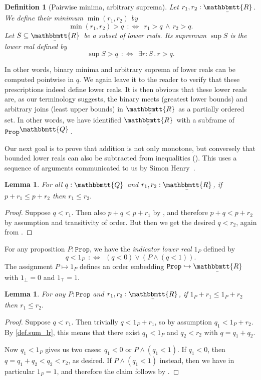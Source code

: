 \documentclass[reqno,11pt]{amsproc}
\theoremstyle{plain}
\newtheorem{lemma}[theorem]{Lemma}
\newtheorem{definition}[theorem]{Definition}
\theoremstyle{definition}
\newcommand{\Const}[1]{\mathtt{#1}}
\newcommand{\ubar}[1]{\underaccent{\bar}{#1}}
\newcommand{\ind}[1]{1_{#1}}			%
\newcommand{\internal}[1]{\raisebox{-.03ex}{$\mathbbmtt{#1}$}}
\newcommand{\hs}{\hspace{1pt}}
\newcommand{\tqq}{\internal{Q}\hs}
\newcommand{\trr}{\internal{R}}
\newcommand{\tlrr}{\ubar{\trr}\hs}
\newcommand{\prop}{\Const{Prop}}
\renewcommand{\iff}{\Leftrightarrow}
\numberwithin{equation}{section}
\begin{document}
\begin{definition}[Pairwise minima, arbitrary suprema]\label{def.min_sup}
Let $r_1,r_2:\tlrr$. We define their \emph{minimum} $\min(r_1,r_2)$ by
\[
	\min(r_1, r_2) > q \:\::\iff\:\: r_1 > q \,\wedge\, r_2 > q.
\]
Let $S \subseteq \tlrr$ be a subset of lower reals.
Its \emph{supremum} $\sup S$ is the lower real defined  by 
\[
	\sup S > q \:\::\iff\:\: \exists r : S \,.\, r > q.
\]
\end{definition}

In other words, binary minima and arbitrary suprema of lower reals can be computed pointwise in $q$. We again leave it to the reader to verify that these prescriptions indeed define lower reals. It is then obvious that these lower reals are, as our terminology suggests, the binary meets (greatest lower bounds) and arbitrary joins (least upper bounds) in $\tlrr$ as a partially ordered set. In other words, we have identified $\tlrr$ with a subframe of $\prop^{\tqq}$.

Our next goal is to prove that addition is not only monotone, but conversely that bounded lower reals can also be subtracted from inequalities (). This uses a sequence of arguments communicated to us by Simon Henry~\cite{henry2012simplification}.

\begin{lemma}
	\label{cancel_rationals}
	For all $q:\tqq$ and $r_1,r_2:\tlrr$, if $p + r_1\le p + r_2$ then $r_1 \le r_2$.
\end{lemma}

\begin{proof}
	Suppose $q < r_1$. Then also $p + q < p + r_1$ by , and therefore $p + q < p + r_2$ by assumption and transitivity of order. But then we get the desired $q < r_2$, again from .
\end{proof}

For any proposition $P : \prop$, we have the \emph{indicator lower real} $\ind{P}$ defined by
\[
	q < 1_P \:\::\iff\:\: (q < 0) \lor (P \land (q < 1)).
\]
The assignment $P \mapsto \ind{P}$ defines an order embedding $\prop \hookrightarrow \tlrr$ with $\ind{\bot} = 0$ and $\ind{\top} = 1$.

\begin{lemma}\label{order_cancel_props}
For any $P:\prop$ and $r_1,r_2:\tlrr$, if $\ind{P}+r_1\le \ind{P}+r_2$ then $r_1\le r_2$.
\end{lemma}

\begin{proof}
Suppose $q < r_1$. Then trivially $q < \ind{P} + r_1$, so by assumption $q_1<\ind{P}+r_2$. By \cref{def.sum_lr}, this means that there exist $q_1 < \ind{P}$ and $q_2 < r_2$ with $q = q_1 + q_2$.

Now $q_1 < \ind{P}$ gives us two cases: $q_1 < 0$ or $P \land (q_1 < 1)$. If $q_1 < 0$, then $q = q_1 + q_2 < q_2 < r_2$, as desired. If $P \land (q_1 < 1)$ instead, then we have in particular $1_P = 1$, and therefore the claim follows by .
\end{proof}
\end{document}
